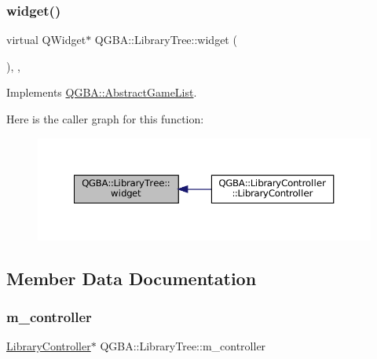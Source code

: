 \subsubsection{\texorpdfstring{widget()}{widget()}}
{\footnotesize\ttfamily virtual Q\+Widget$\ast$ Q\+G\+B\+A\+::\+Library\+Tree\+::widget (\begin{DoxyParamCaption}{ }\end{DoxyParamCaption})\hspace{0.3cm}{\ttfamily [inline]}, {\ttfamily [override]}, {\ttfamily [virtual]}}



Implements \mbox{\hyperlink{class_q_g_b_a_1_1_abstract_game_list_a1854b55a36d86e0695146872d37d19d2}{Q\+G\+B\+A\+::\+Abstract\+Game\+List}}.

Here is the caller graph for this function\+:
\nopagebreak
\begin{figure}[H]
\begin{center}
\leavevmode
\includegraphics[width=350pt]{class_q_g_b_a_1_1_library_tree_ad626b8a7235cd5e88876391a85d0ca3f_icgraph}
\end{center}
\end{figure}


\subsection{Member Data Documentation}
\mbox{\label{class_q_g_b_a_1_1_library_tree_a616e48f8aa8e9eb59cd672d2ede2cf8c}} 
\subsubsection{\texorpdfstring{m\+\_\+controller}{m\_controller}}
{\footnotesize\ttfamily \mbox{\hyperlink{class_q_g_b_a_1_1_library_controller}{Library\+Controller}}$\ast$ Q\+G\+B\+A\+::\+Library\+Tree\+::m\+\_\+controller\hspace{0.3cm}{\ttfamily [private]}}

